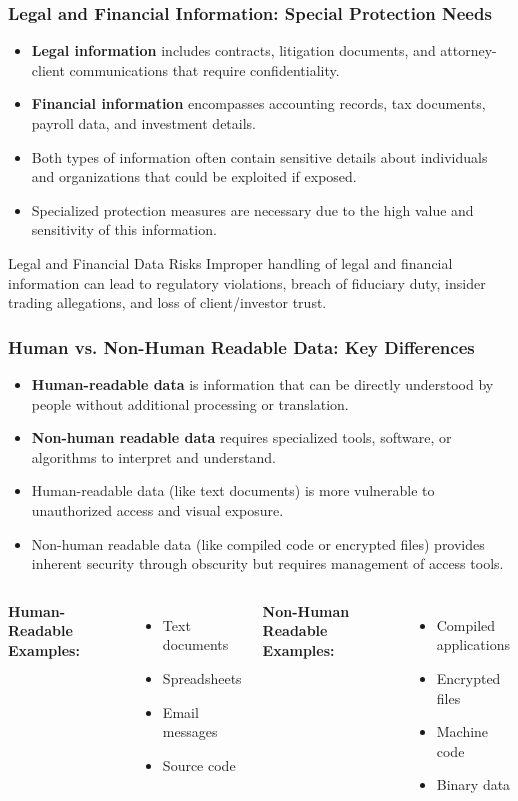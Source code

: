 \documentclass{beamer}
\begin{document}
\begin{frame}
\frametitle{Legal and Financial Information: Special Protection Needs}
\begin{itemize}
\item \textbf{Legal information} includes contracts, litigation documents, and attorney-client communications that require confidentiality.
\item \textbf{Financial information} encompasses accounting records, tax documents, payroll data, and investment details.
\item Both types of information often contain sensitive details about individuals and organizations that could be exploited if exposed.
\item Specialized protection measures are necessary due to the high value and sensitivity of this information.
\end{itemize}

\begin{alertblock}{Legal and Financial Data Risks}
Improper handling of legal and financial information can lead to regulatory violations, breach of fiduciary duty, insider trading allegations, and loss of client/investor trust.
\end{alertblock}
\end{frame}

\begin{frame}
\frametitle{Human vs. Non-Human Readable Data: Key Differences}
\begin{itemize}
\item \textbf{Human-readable data} is information that can be directly understood by people without additional processing or translation.
\item \textbf{Non-human readable data} requires specialized tools, software, or algorithms to interpret and understand.
\item Human-readable data (like text documents) is more vulnerable to unauthorized access and visual exposure.
\item Non-human readable data (like compiled code or encrypted files) provides inherent security through obscurity but requires management of access tools.
\end{itemize}

\begin{columns}
\textbf{Human-Readable Examples:}
\begin{itemize}
\item Text documents
\item Spreadsheets
\item Email messages
\item Source code
\end{itemize}

\textbf{Non-Human Readable Examples:}
\begin{itemize}
\item Compiled applications
\item Encrypted files
\item Machine code
\item Binary data
\end{itemize}
\end{columns}
\end{frame}
\end{document}
